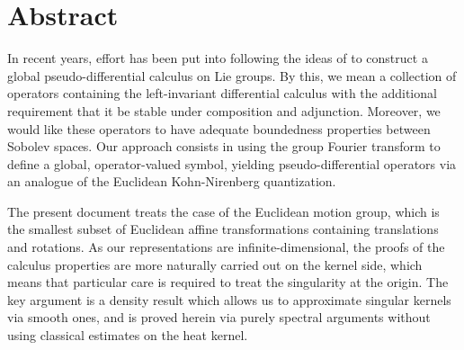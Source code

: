 \chapter*{Abstract}

In recent years,
effort has been put into following the ideas of \citeauthor{RuzhanskyTurunen10}
to construct a global pseudo-differential calculus on Lie groups.
By this, we mean a collection of operators containing the left-invariant differential calculus
with the additional requirement that it be stable under composition and adjunction.
Moreover,
we would like these operators to
have adequate boundedness properties between Sobolev spaces.
Our approach consists in using the group Fourier transform to define a global, operator-valued symbol,
yielding pseudo-differential operators via an analogue of the Euclidean Kohn-Nirenberg quantization.

The present document treats the case of the Euclidean motion group,
which is the smallest subset of Euclidean affine transformations containing translations and rotations.
As our representations are infinite-dimensional,
the proofs of the calculus properties are more naturally carried out on the kernel side,
which means that particular care is required to treat the singularity at the origin.
The key argument is a density result which allows us to approximate singular kernels via smooth ones,
and is proved herein via purely spectral arguments without using classical estimates on the heat kernel.
